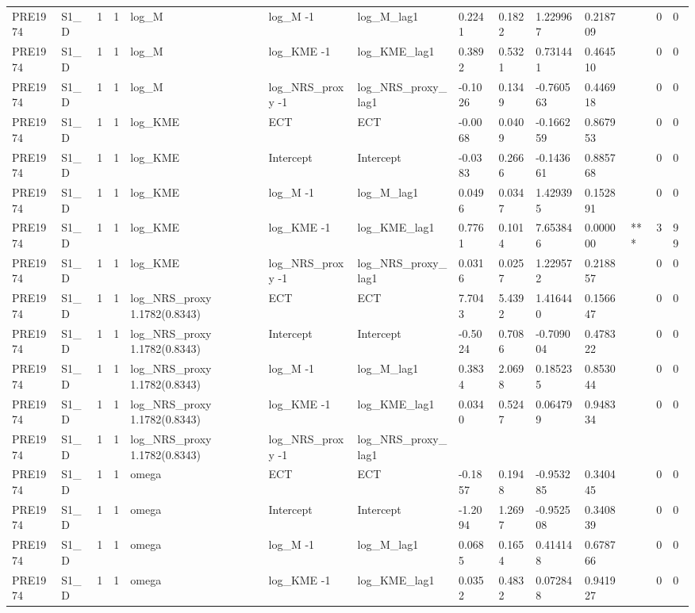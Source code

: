 \begin{tabular}{llllllllllllll}
PRE1974 & S1\_D & 1 & 1 & log\_M & log\_M -1 & log\_M\_lag1 & 0.2241 & 0.1822 & 1.229967 & 0.218709 &  & 0 & 0 \\
PRE1974 & S1\_D & 1 & 1 & log\_M & log\_KME -1 & log\_KME\_lag1 & 0.3892 & 0.5321 & 0.731441 & 0.464510 &  & 0 & 0 \\
PRE1974 & S1\_D & 1 & 1 & log\_M & log\_NRS\_proxy -1 & log\_NRS\_proxy\_lag1 & -0.1026 & 0.1349 & -0.760563 & 0.446918 &  & 0 & 0 \\
PRE1974 & S1\_D & 1 & 1 & log\_KME & ECT & ECT & -0.0068 & 0.0409 & -0.166259 & 0.867953 &  & 0 & 0 \\
PRE1974 & S1\_D & 1 & 1 & log\_KME & Intercept & Intercept & -0.0383 & 0.2666 & -0.143661 & 0.885768 &  & 0 & 0 \\
PRE1974 & S1\_D & 1 & 1 & log\_KME & log\_M -1 & log\_M\_lag1 & 0.0496 & 0.0347 & 1.429395 & 0.152891 &  & 0 & 0 \\
PRE1974 & S1\_D & 1 & 1 & log\_KME & log\_KME -1 & log\_KME\_lag1 & 0.7761 & 0.1014 & 7.653846 & 0.000000 & *** & 3 & 99 \\
PRE1974 & S1\_D & 1 & 1 & log\_KME & log\_NRS\_proxy -1 & log\_NRS\_proxy\_lag1 & 0.0316 & 0.0257 & 1.229572 & 0.218857 &  & 0 & 0 \\
PRE1974 & S1\_D & 1 & 1 & log\_NRS\_proxy 1.1782(0.8343) & ECT & ECT & 7.7043 & 5.4392 & 1.416440 & 0.156647 &  & 0 & 0 \\
PRE1974 & S1\_D & 1 & 1 & log\_NRS\_proxy 1.1782(0.8343) & Intercept & Intercept & -0.5024 & 0.7086 & -0.709004 & 0.478322 &  & 0 & 0 \\
PRE1974 & S1\_D & 1 & 1 & log\_NRS\_proxy 1.1782(0.8343) & log\_M -1 & log\_M\_lag1 & 0.3834 & 2.0698 & 0.185235 & 0.853044 &  & 0 & 0 \\
PRE1974 & S1\_D & 1 & 1 & log\_NRS\_proxy 1.1782(0.8343) & log\_KME -1 & log\_KME\_lag1 & 0.0340 & 0.5247 & 0.064799 & 0.948334 &  & 0 & 0 \\
PRE1974 & S1\_D & 1 & 1 & log\_NRS\_proxy 1.1782(0.8343) & log\_NRS\_proxy -1 & log\_NRS\_proxy\_lag1 &  &  &  &  &  &  &  \\
PRE1974 & S1\_D & 1 & 1 & omega & ECT & ECT & -0.1857 & 0.1948 & -0.953285 & 0.340445 &  & 0 & 0 \\
PRE1974 & S1\_D & 1 & 1 & omega & Intercept & Intercept & -1.2094 & 1.2697 & -0.952508 & 0.340839 &  & 0 & 0 \\
PRE1974 & S1\_D & 1 & 1 & omega & log\_M -1 & log\_M\_lag1 & 0.0685 & 0.1654 & 0.414148 & 0.678766 &  & 0 & 0 \\
PRE1974 & S1\_D & 1 & 1 & omega & log\_KME -1 & log\_KME\_lag1 & 0.0352 & 0.4832 & 0.072848 & 0.941927 &  & 0 & 0 \\

\end{tabular}
